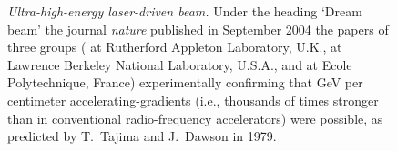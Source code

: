\documentclass [12pt,a4paper,     ]{report} %
\begin{document}
%
\begin{figure}
\begin{center}
\caption[`Dream Beam:' Ultra-high-energy laser-driven beam]{\emph{Ultra-high-energy laser-driven beam.} Under the heading `Dream beam' the journal \emph{nature} published in  September 2004 the papers of three groups (\cite{MANGL2004-} at Rutherford Appleton Laboratory, U.K., \cite{GEDDE2004-} at Lawrence Berkeley National Laboratory, U.S.A., and \cite{FAURE2004-} at Ecole Polytechnique, France) experimentally confirming that GeV per centimeter accelerating-gradients (i.e., thousands of times stronger than in conventional radio-frequency accelerators) were possible, as predicted by T.\ Tajima and J.\ Dawson in 1979.  
\label{fig:db}}
\end{center}
\end{figure}
%
\end{document}
